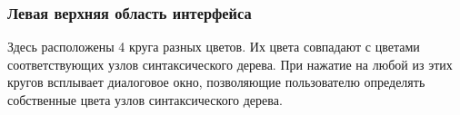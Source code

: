\documentclass[a4paper,12pt]{article}
\begin{document}
  \subsubsection{Левая верхняя область интерфейса}
  \label{sec:a4}
  Здесь расположены 4 круга разных цветов.
  Их цвета совпадают с цветами соответствующих узлов синтаксического дерева.
  При нажатие на любой из этих кругов всплывает диалоговое окно,
  позволяющие пользователю определять собственные цвета узлов синтаксического дерева. 

  \begin{CRTbibliography}
  \end{CRTbibliography}

  \CRTterminology

  \CRTlistRegistration
\end{document}
